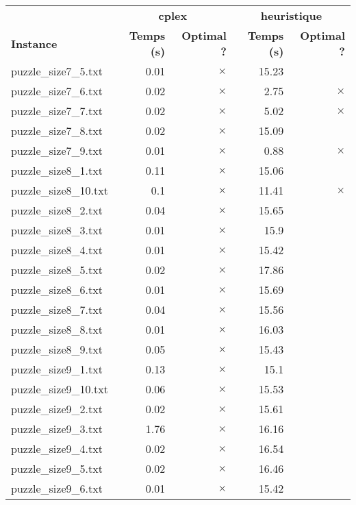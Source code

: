 \documentclass{article}
\begin{document}
\newpage
\begin{center}
\renewcommand{\arraystretch}{1.4} 
\begin{tabular}{lrrrr}
	\hline
 & \multicolumn{2}{c}{\textbf{cplex}} & \multicolumn{2}{c}{\textbf{heuristique}}\\
\textbf{Instance}  & \textbf{Temps (s)} & \textbf{Optimal ?}  & \textbf{Temps (s)} & \textbf{Optimal ?} \\\hline

puzzle\_size7\_5.txt & 0.01 & 
$\times$
 & 15.23 & 
\\
puzzle\_size7\_6.txt & 0.02 & 
$\times$
 & 2.75 & 
$\times$
\\
puzzle\_size7\_7.txt & 0.02 & 
$\times$
 & 5.02 & 
$\times$
\\
puzzle\_size7\_8.txt & 0.02 & 
$\times$
 & 15.09 & 
\\
puzzle\_size7\_9.txt & 0.01 & 
$\times$
 & 0.88 & 
$\times$
\\
puzzle\_size8\_1.txt & 0.11 & 
$\times$
 & 15.06 & 
\\
puzzle\_size8\_10.txt & 0.1 & 
$\times$
 & 11.41 & 
$\times$
\\
puzzle\_size8\_2.txt & 0.04 & 
$\times$
 & 15.65 & 
\\
puzzle\_size8\_3.txt & 0.01 & 
$\times$
 & 15.9 & 
\\
puzzle\_size8\_4.txt & 0.01 & 
$\times$
 & 15.42 & 
\\
puzzle\_size8\_5.txt & 0.02 & 
$\times$
 & 17.86 & 
\\
puzzle\_size8\_6.txt & 0.01 & 
$\times$
 & 15.69 & 
\\
puzzle\_size8\_7.txt & 0.04 & 
$\times$
 & 15.56 & 
\\
puzzle\_size8\_8.txt & 0.01 & 
$\times$
 & 16.03 & 
\\
puzzle\_size8\_9.txt & 0.05 & 
$\times$
 & 15.43 & 
\\
puzzle\_size9\_1.txt & 0.13 & 
$\times$
 & 15.1 & 
\\
puzzle\_size9\_10.txt & 0.06 & 
$\times$
 & 15.53 & 
\\
puzzle\_size9\_2.txt & 0.02 & 
$\times$
 & 15.61 & 
\\
puzzle\_size9\_3.txt & 1.76 & 
$\times$
 & 16.16 & 
\\
puzzle\_size9\_4.txt & 0.02 & 
$\times$
 & 16.54 & 
\\
puzzle\_size9\_5.txt & 0.02 & 
$\times$
 & 16.46 & 
\\
puzzle\_size9\_6.txt & 0.01 & 
$\times$
 & 15.42 & 
\\

\end{tabular}
\end{center}
\end{document}
